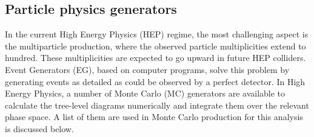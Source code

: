 \subsection{Particle physics generators}\label{sec:gnerators}
In the current High Energy Physics (HEP) regime, the most challenging aspect is the multiparticle production, where the observed particle multiplicities extend to hundred. These multiplicities are expected to go upward in future HEP colliders. Event Generators (EG), based on computer programs, solve this problem by generating events as detailed as could be observed by a perfect detector.   
In High Energy Physics, a number of Monte Carlo (MC) generators are available to calculate the tree-level diagrams numerically and integrate them over the relevant phase space. A list of them are used in Monte Carlo production for this analysis is discussed below.
